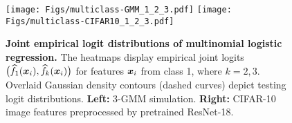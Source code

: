 


\begin{figure}[h]
    \centering
    \texttt{[image: Figs/multiclass-GMM\_1\_2\_3.pdf]}
    \texttt{[image: Figs/multiclass-CIFAR10\_1\_2\_3.pdf]}
    \caption{
    \textbf{Joint empirical logit distributions of multinomial logistic regression.} The heatmaps display empirical joint logits $\bigl(\widehat f_{1}(\text{\boldmath $x$}_i), \widehat f_{k}(\text{\boldmath $x$}_i)\bigr)$ for features $\text{\boldmath $x$}_i$ from class 1, where $k=2,3$. Overlaid Gaussian density contours (dashed curves) depict testing logit distributions. 
    \textbf{Left:} 3-GMM simulation. \textbf{Right:} CIFAR-10 image features  preprocessed by pretrained ResNet-18.
    }
    \label{fig:multiclass}
\end{figure}

